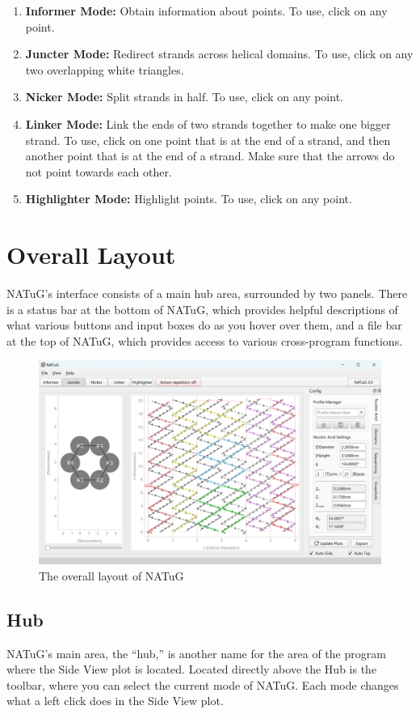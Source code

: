 \documentclass[titlepage]{article}
\begin{document}
\begin{enumerate}
	\item \textbf{Informer Mode:} Obtain information about points. To use, click on any point.
	\item \textbf{Juncter Mode:} Redirect strands across helical domains. To use, click on any two overlapping white triangles.
	\item \textbf{Nicker Mode:} Split strands in half. To use, click on any point.
	\item \textbf{Linker Mode:} Link the ends of two strands together to make one bigger strand. To use, click on one point that is at the end of a strand, and then another point that is at the end of a strand. Make sure that the arrows do not point towards each other.
	\item \textbf{Highlighter Mode:} Highlight points. To use, click on any point.
\end{enumerate}

\section{Overall Layout}

NATuG’s interface consists of a main hub area, surrounded by two panels. There is a status bar at the bottom of NATuG, which provides helpful descriptions of what various buttons and input boxes do as you hover over them, and a file bar at the top of NATuG, which provides access to various cross-program functions.

\begin{figure}[h]
	\centering
	\caption{The overall layout of NATuG}
	\label{program-layout}
	\includegraphics[width=5in]{program-layout.png}
\end{figure}

\subsection{Hub}
NATuG's main area, the “hub,” is another name for the area of the program where the Side View plot is located. Located directly above the Hub is the toolbar, where you can select the current mode of NATuG. Each mode changes what a left click does in the Side View plot.
\end{document}
